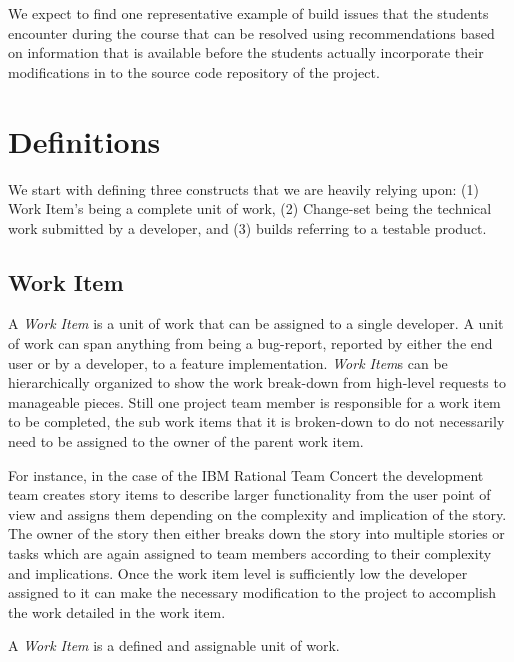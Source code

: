 We expect to find one representative example of build issues that the students encounter during the course that can be resolved using recommendations based on information that is available before the students actually incorporate their modifications in to the source code repository of the project.

\section{Definitions}
\label{c5:sec:definitions}
We start with defining three constructs that we are heavily relying upon: (1) Work Item's being a complete unit of work, (2) Change-set being the technical work submitted by a developer, and (3) builds referring to a testable product.

\subsection{Work Item}
A \emph{Work Item} is a unit of work that can be assigned to a single developer.
A unit of work can span anything from being a bug-report, reported by either the end user or by a developer, to a feature implementation.
\emph{Work Item}s can be hierarchically organized to show the work break-down from high-level requests to manageable pieces.
Still one project team member is responsible for a work item to be completed, the sub work items that it is broken-down to do not necessarily need to be assigned to the owner of the parent work item.

For instance, in the case of the IBM Rational Team Concert the development team creates story items to describe larger functionality from the user point of view and assigns them depending on the complexity and implication of the story.
The owner of the story then either breaks down the story into multiple stories or tasks which are again assigned to team members according to their complexity and implications.
Once the work item level is sufficiently low the developer assigned to it can make the necessary modification to the project to accomplish the work detailed in the work item.

\begin{note}
\begin{mydef}
A \emph{Work Item} is a defined and assignable unit of work.
\end{mydef}
\end{note} 


